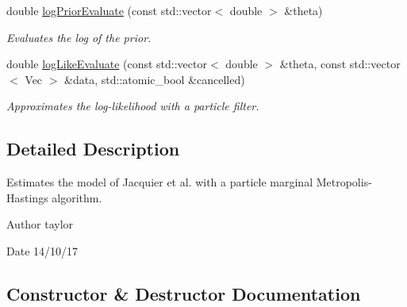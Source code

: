 \begin{DoxyCompactItemize}
double \hyperlink{classPmmh__jac__apf_ade139b7e8122a9cc37d4aae22e6ec752}{log\+Prior\+Evaluate} (const std\+::vector$<$ double $>$ \&theta)
\begin{DoxyCompactList}\small\item\em Evaluates the log of the prior. \end{DoxyCompactList}\item 
double \hyperlink{classPmmh__jac__apf_a34973f896a5fe11b04f93cc80ee54474}{log\+Like\+Evaluate} (const std\+::vector$<$ double $>$ \&theta, const std\+::vector$<$ Vec $>$ \&data, std\+::atomic\+\_\+bool \&cancelled)
\begin{DoxyCompactList}\small\item\em Approximates the log-\/likelihood with a particle filter. \end{DoxyCompactList}\end{DoxyCompactItemize}


\subsection{Detailed Description}
Estimates the model of Jacquier et al. with a particle marginal Metropolis-\/\+Hastings algorithm. 

\begin{DoxyAuthor}{Author}
taylor 
\end{DoxyAuthor}
\begin{DoxyDate}{Date}
14/10/17 
\end{DoxyDate}


\subsection{Constructor \& Destructor Documentation}
